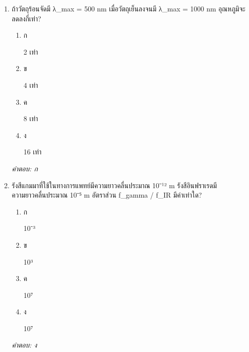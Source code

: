 \documentclass[12pt]{article}
\begin{document}
\begin{enumerate}[label=\arabic*., itemsep=0.5\baselineskip, topsep=0.5\baselineskip, leftmargin=*]
\item ถ้าวัตถุร้อนจัดมี λ\_max = 500 nm เมื่อวัตถุเย็นลงจนมี λ\_max = 1000 nm อุณหภูมิจะลดลงกี่เท่า?
\begin{enumerate}[label=\alph*)., itemsep=0.3\baselineskip, topsep=0.3\baselineskip]
\item ก\ 
\begin{minipage}[t]{0.9\linewidth}
\raggedright 2 เท่า
\end{minipage}
\item ข\ 
\begin{minipage}[t]{0.9\linewidth}
\raggedright 4 เท่า
\end{minipage}
\item ค\ 
\begin{minipage}[t]{0.9\linewidth}
\raggedright 8 เท่า
\end{minipage}
\item ง\ 
\begin{minipage}[t]{0.9\linewidth}
\raggedright 16 เท่า
\end{minipage}
\end{enumerate}
\vspace{-0.3\baselineskip}
\begin{small}
\textit{คำตอบ: ก}
\end{small}

\item รังสีแกมมาที่ใช้ในทางการแพทย์มีความยาวคลื่นประมาณ 10⁻¹² m รังสีอินฟราเรดมีความยาวคลื่นประมาณ 10⁻⁵ m อัตราส่วน f\_gamma / f\_IR มีค่าเท่าใด?
\begin{enumerate}[label=\alph*)., itemsep=0.3\baselineskip, topsep=0.3\baselineskip]
\item ก\ 
\begin{minipage}[t]{0.9\linewidth}
\raggedright 10⁻³
\end{minipage}
\item ข\ 
\begin{minipage}[t]{0.9\linewidth}
\raggedright 10³
\end{minipage}
\item ค\ 
\begin{minipage}[t]{0.9\linewidth}
\raggedright 10⁷
\end{minipage}
\item ง\ 
\begin{minipage}[t]{0.9\linewidth}
\raggedright 10⁷
\end{minipage}
\end{enumerate}
\vspace{-0.3\baselineskip}
\begin{small}
\textit{คำตอบ: ง}
\end{small}


\end{enumerate}
\end{document}
